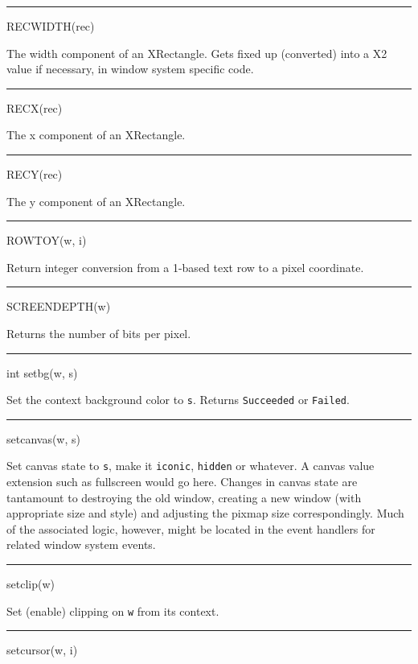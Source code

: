 {\sffamily\bfseries
\bigskip\hrule\vspace{0.1cm}
\noindent
RECWIDTH(rec)}


The width component of an XRectangle. Gets {\textquotedbl}fixed
up{\textquotedbl} (converted) into a X2 value if necessary, in window
system specific code.


{\sffamily\bfseries
\bigskip\hrule\vspace{0.1cm}
\noindent
RECX(rec)}


The x component of an XRectangle.


{\sffamily\bfseries
\bigskip\hrule\vspace{0.1cm}
\noindent
RECY(rec)}


The y component of an XRectangle.


{\sffamily\bfseries
\bigskip\hrule\vspace{0.1cm}
\noindent
ROWTOY(w, i)}


Return integer conversion from a 1-based text row to a pixel coordinate.


{\sffamily\bfseries
\bigskip\hrule\vspace{0.1cm}
\noindent
SCREENDEPTH(w)}


Returns the number of bits per pixel.


{\sffamily\bfseries
\bigskip\hrule\vspace{0.1cm}
\noindent
int setbg(w, s)}


Set the context background color to \texttt{s}. Returns
\texttt{Succeeded} or \texttt{Failed}.


{\sffamily\bfseries
\bigskip\hrule\vspace{0.1cm}
\noindent
setcanvas(w, s)}


Set canvas state to \texttt{s}, make it
\texttt{{\textquotedbl}iconic{\textquotedbl}},
\texttt{{\textquotedbl}hidden{\textquotedbl}} or whatever. A canvas
value extension such as fullscreen would go here.  Changes in canvas
state are tantamount to destroying the old window, creating a new
window (with appropriate size and style) and adjusting the pixmap size
correspondingly. Much of the associated logic, however, might be
located in the event handlers for related window system events.


{\sffamily\bfseries
\bigskip\hrule\vspace{0.1cm}
\noindent
setclip(w)}


Set (enable) clipping on \texttt{w} from its context.


{\sffamily\bfseries
\bigskip\hrule\vspace{0.1cm}
\noindent
setcursor(w, i)}


